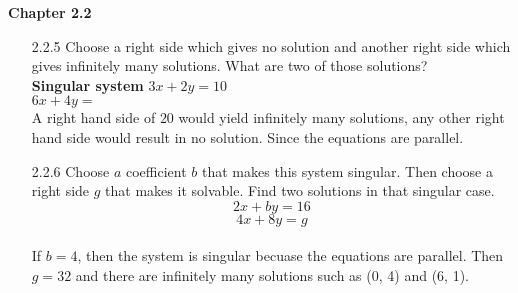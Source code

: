 \documentclass[10pt,twoside,reqno]{article}
\begin{document}
\vspace{5mm}
\textbf{Chapter 2.2}
\begin{enumerate}
\item[2.2.5]Choose a right side which gives no solution and another right side which gives infinitely many solutions. What are two of those solutions? \\
\vspace{3mm}
\hspace{100pt}
\textbf{Singular system}
\hspace{45pt}
$3x + 2y = 10$\\
\hspace{232pt}
$6x + 4y =$\\
\vspace{3mm}
A right hand side of $20$ would yield infinitely many solutions, any other right hand side would result in no solution. Since the equations are parallel.\\
\item[2.2.6]Choose $a$ coefficient $b$ that makes this system singular. Then choose a right side $g$ that makes it solvable. Find two solutions in that singular case. \\
$$2x + by = 16$$ $$4x + 8y = g$$\\
If $b = 4$, then the system is singular becuase the equations are parallel. Then $g = 32$ and there are infinitely many solutions such as (0, 4) and (6, 1).\\


\end{enumerate}
\end{document}
